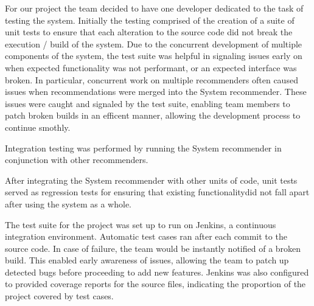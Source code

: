 \documentclass{l3proj}
\begin{document}
For our project the team decided to have one developer dedicated to the task of testing the system. %
Initially the testing comprised of the creation of a suite of unit tests to ensure that each alteration to the source code did not break the execution / build of the system.
Due to the concurrent development of multiple components of the system, the test suite was helpful in signaling issues early on when expected functionality was not performant, or an expected interface was broken. In particular, concurrent work on multiple recommenders often caused issues when recommendations were merged into the System recommender. These issues were caught and signaled by the test suite, enabling team members to patch broken builds in an efficent manner, allowing the development process to continue smothly.

Integration testing was performed by running the System recommender in conjunction with other recommenders.

After integrating the System recommender with other units of code, unit tests served as regression tests for ensuring that existing functionalitydid not fall apart after using the system as a whole.

The test suite for the project was set up to run on Jenkins, a continuous integration environment. Automatic test cases ran after each commit to the source code. In case of failure, the team would be instantly notified of a broken build. This enabled early awareness of issues, allowing the team to patch up detected bugs before proceeding to add new features.
Jenkins was also configured to provided coverage reports for the source files, indicating the proportion of the project covered by test cases.
\end{document}
